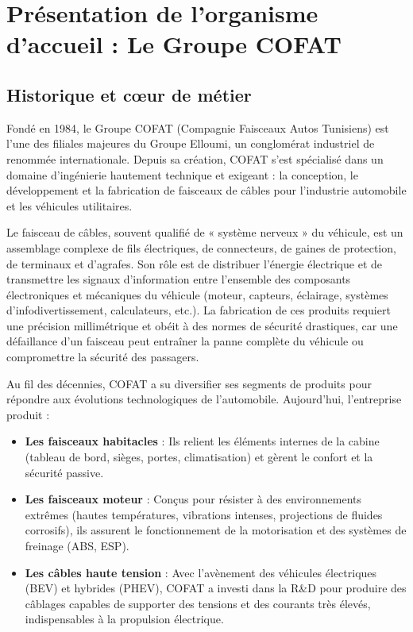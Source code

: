 \section{Présentation de l'organisme d'accueil : Le Groupe COFAT}

\subsection{Historique et cœur de métier}
Fondé en 1984, le Groupe COFAT (Compagnie Faisceaux Autos Tunisiens) est l'une des filiales majeures du Groupe Elloumi, un conglomérat industriel de renommée internationale. Depuis sa création, COFAT s'est spécialisé dans un domaine d'ingénierie hautement technique et exigeant : la conception, le développement et la fabrication de faisceaux de câbles pour l'industrie automobile et les véhicules utilitaires. 

Le faisceau de câbles, souvent qualifié de « système nerveux » du véhicule, est un assemblage complexe de fils électriques, de connecteurs, de gaines de protection, de terminaux et d'agrafes. Son rôle est de distribuer l'énergie électrique et de transmettre les signaux d'information entre l'ensemble des composants électroniques et mécaniques du véhicule (moteur, capteurs, éclairage, systèmes d'infodivertissement, calculateurs, etc.). La fabrication de ces produits requiert une précision millimétrique et obéit à des normes de sécurité drastiques, car une défaillance d'un faisceau peut entraîner la panne complète du véhicule ou compromettre la sécurité des passagers.

Au fil des décennies, COFAT a su diversifier ses segments de produits pour répondre aux évolutions technologiques de l'automobile. Aujourd'hui, l'entreprise produit :
\begin{itemize}
    \item \textbf{Les faisceaux habitacles} : Ils relient les éléments internes de la cabine (tableau de bord, sièges, portes, climatisation) et gèrent le confort et la sécurité passive.
    \item \textbf{Les faisceaux moteur} : Conçus pour résister à des environnements extrêmes (hautes températures, vibrations intenses, projections de fluides corrosifs), ils assurent le fonctionnement de la motorisation et des systèmes de freinage (ABS, ESP).
    \item \textbf{Les câbles haute tension} : Avec l'avènement des véhicules électriques (BEV) et hybrides (PHEV), COFAT a investi dans la R\&D pour produire des câblages capables de supporter des tensions et des courants très élevés, indispensables à la propulsion électrique.
\end{itemize}

